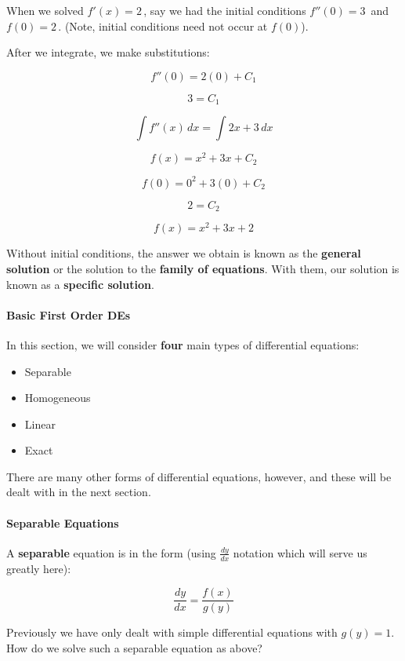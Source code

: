 When we solved $f'(x) = 2 \,$, say we had the initial conditions $f''(0) = 3 \,$ and $f(0) = 2 \,$. (Note, initial conditions need not occur at $f(0)$).



After we integrate, we make substitutions:

$$f''(0) = 2(0) + C_1$$

$$3 = C_1$$

$$\int f''(x) \,dx = \int 2x + 3 \,dx$$

$$f(x) = x^2 + 3x + C_2$$

$$f(0) = 0^2 + 3(0) + C_2$$

$$2 = C_2$$

$$f(x) = x^2 + 3x + 2$$



Without initial conditions, the answer we obtain is known as the \textbf{general solution} or the solution to the \textbf{family of equations}. With them, our solution is known as a \textbf{specific solution}.



\paragraph{Basic First Order DEs}

In this section, we will consider \textbf{four} main types of differential equations:

\begin{itemize}
    \item Separable
    \item Homogeneous
    \item Linear
    \item Exact
\end{itemize}

There are many other forms of differential equations, however, and these will be dealt with in the next section.



\paragraph{Separable Equations}

A \textbf{separable} equation is in the form (using $\frac{dy}{dx}$ notation which will serve us greatly here):

$$\frac{dy}{dx} = \frac{f(x)}{g(y)}$$



Previously we have only dealt with simple differential equations with $g(y) = 1$. How do we solve such a separable equation as above?



